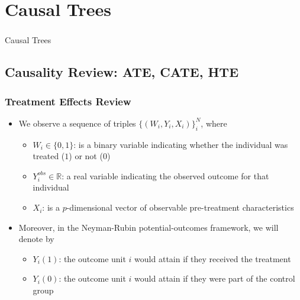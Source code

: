 \documentclass[
  shownotes,
  xcolor={svgnames},
  hyperref={colorlinks,citecolor=DarkBlue,linkcolor=DarkRed,urlcolor=DarkBlue}
  , aspectratio=169]{beamer}
\begin{document}
\section{Causal Trees}

\begin{frame}[fragile]
\frametitle{}


\centering
{\huge \textcolor{andesred}{Causal Trees}}



\end{frame}
\subsection{Causality Review: ATE, CATE, HTE}
\begin{frame}[fragile]
\frametitle{Treatment Effects Review}

\begin{itemize}
\item We observe a sequence of triples $\{(W_i, Y_i, X_i)\}_{i}^{N}$, where
\medskip

\begin{itemize}

\item \(W_{i} \in \{0, 1\}\): is a binary variable indicating whether the individual was treated (\(1\)) or not (\(0\))
\medskip
\item \(Y_{i}^{obs} \in \mathbb{R}\): a real variable indicating the observed outcome for that individual
\medskip
\item \(X_{i}\): is a \(p\)-dimensional vector of observable pre-treatment characteristics
\end{itemize}
\medskip
 \item Moreover, in the Neyman-Rubin potential-outcomes framework, we will denote by 
 \medskip
 \begin{itemize}
\item \(Y_{i}(1)\): the outcome unit \(i\) would attain if they received the  treatment
\medskip
\item \(Y_{i}(0)\): the outcome unit \(i\) would attain if they were part of the control group
\end{itemize}

\end{itemize}



\end{frame}
\end{document}
